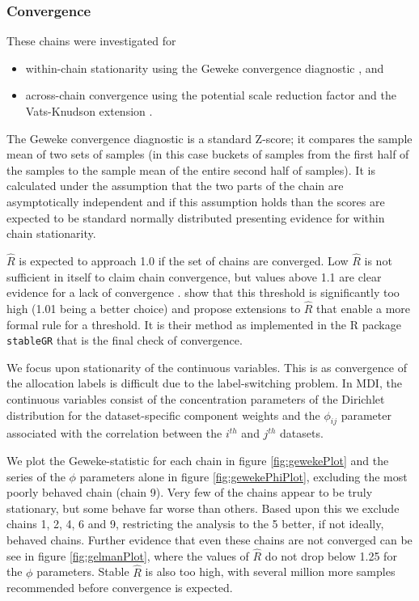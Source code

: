\documentclass[]{article}
\begin{document}
\subsubsection{Convergence} \label{sec:bayesianConvergence}
These chains were investigated for 
\begin{itemize}
	\item within-chain stationarity using the Geweke convergence diagnostic \citep{geweke1991evaluating}, and
	\item across-chain convergence using the potential scale reduction factor \citep[$\hat{R}$, ][]{gelman1992inference} and the Vats-Knudson extension \citep[\emph{stable $\hat{R}$},][]{vats2018revisiting}.
\end{itemize}
The Geweke convergence diagnostic is a standard Z-score; it compares the sample mean of two sets of samples (in this case buckets of samples from the first half of the samples to the sample mean of the entire second half of samples). It is calculated under the assumption that the two parts of the chain are asymptotically independent and if this assumption holds than the scores are expected to be standard normally distributed presenting evidence for within chain stationarity.

$\hat{R}$ is expected to approach 1.0 if the set of chains are converged. Low $\hat{R}$ is not sufficient in itself to claim chain convergence, but values above 1.1 are clear evidence for a lack of convergence \citep{gelman2013bayesian}. \cite{vats2018revisiting} show that this threshold is significantly too high (1.01 being a better choice) and propose extensions to $\hat{R}$ that enable a more formal rule for a threshold. It is their method as implemented in the R package \texttt{stableGR} \citep{knudson20202stableGR} that is the final check of convergence.

We focus upon stationarity of the continuous variables. This is as convergence of the allocation labels is difficult due to the label-switching problem. In MDI, the continuous variables consist of the concentration parameters of the Dirichlet distribution for the dataset-specific component weights and the $\phi_{ij}$ parameter associated with the correlation between the $i^{th}$ and $j^{th}$ datasets. 

We plot the Geweke-statistic for each chain in figure \ref{fig:gewekePlot} and the series of the $\phi$ parameters alone in figure \ref{fig:gewekePhiPlot}, excluding the most poorly behaved chain (chain 9). Very few of the chains appear to be truly stationary, but some behave far worse than others. Based upon this we exclude chains 1, 2, 4, 6 and 9, restricting the analysis to the 5 better, if not ideally, behaved chains. Further evidence that even these chains are not converged can be see in figure \ref{fig:gelmanPlot}, where the values of $\hat{R}$ do not drop below 1.25 for the $\phi$ parameters. Stable $\hat{R}$ is also too high, with several million more samples recommended before convergence is expected.
\end{document}
